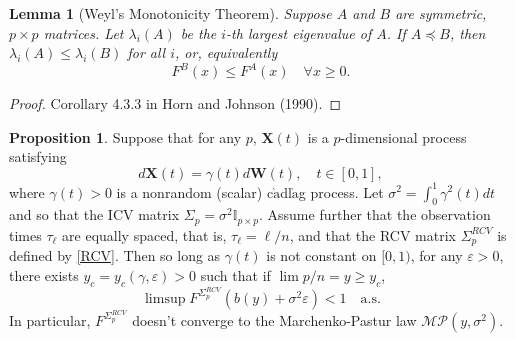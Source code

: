\documentclass[a4paper,11pt]{book}
\theoremstyle{plain}
\newtheorem{lmm}[thm]{Lemma}
\theoremstyle{definition}
\newtheorem{prps}[thm]{Proposition}
\begin{document}
	\begin{lmm}[Weyl's Monotonicity Theorem] \label{Weyl}
		Suppose $A$ and $B$ are symmetric, $p \times p$ matrices. Let $\lambda_i(A)$ be the $i$-th largest eigenvalue of $A$. If $A \preceq B$, then $\lambda_i(A) \leq \lambda_i(B)$ for all $i$, or, equivalently
		\[ F^B(x) \leq F^A(x) \quad \forall x \geq 0. \]
    \end{lmm}
    \begin{proof}
    	Corollary 4.3.3 in Horn and Johnson (1990).
    \end{proof}
		
	\begin{prps} \label{counter RCV}
		Suppose that for any $p$, $\mathbf{X}(t)$ is a $p$-dimensional process satisfying
		\begin{equation}
		d \mathbf{X}(t) = \gamma(t) d\mathbf{W}(t), \quad t \in [0, 1],
		\end{equation}
		where $\gamma(t) > 0$ is a nonrandom (scalar) c$\grave{\text{a}}$dl$\grave{\text{a}}$g process. Let $\sigma^2 = \int_0^1 \gamma^2(t) dt$ and so that the ICV matrix $\Sigma_p = \sigma^2 \mathbb{I}_{p \times p}$. Assume further that the observation times $\tau_{\ell}$ are equally spaced, that is, $\tau_{\ell} = \ell / n$, and that the RCV matrix $\Sigma_p^{RCV}$ is defined by \eqref{RCV}. Then so long as $\gamma(t)$ is not constant on $[0, 1)$, for any $\varepsilon > 0$, there exists $y_c = y_c(\gamma, \varepsilon) > 0$ such that if $\lim p/n = y \geq y_c$,
		\begin{equation}
			\limsup F^{\Sigma_p^{RCV}}(b(y)+\sigma^2\varepsilon) < 1 \quad \text{a.s.}
		\end{equation}
		In particular, $F^{\Sigma_p^{RCV}}$ doesn't converge to the Marchenko-Pastur law $\mathcal{MP}(y, \sigma^2)$.
    \end{prps}
    
\end{document}
